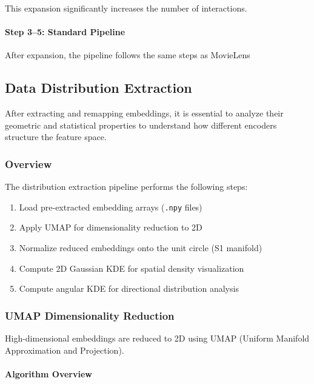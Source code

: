 This expansion significantly increases the number of interactions.

\paragraph{Step 3--5: Standard Pipeline}

After expansion, the pipeline follows the same steps as MovieLens

\subsection{Data Distribution Extraction}

After extracting and remapping embeddings, it is essential to analyze their geometric and statistical properties to understand how different encoders structure the feature space.

\subsubsection{Overview}

The distribution extraction pipeline performs the following steps:
\begin{enumerate}
    \item Load pre-extracted embedding arrays (\texttt{.npy} files)
    \item Apply UMAP for dimensionality reduction to 2D
    \item Normalize reduced embeddings onto the unit circle (S1 manifold)
    \item Compute 2D Gaussian KDE for spatial density visualization
    \item Compute angular KDE for directional distribution analysis
\end{enumerate}

\subsubsection{UMAP Dimensionality Reduction}

High-dimensional embeddings are reduced to 2D using UMAP (Uniform Manifold Approximation and Projection).

\paragraph{Algorithm Overview}

